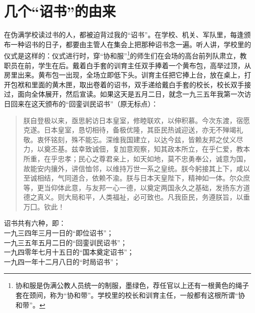 \fancyhead[RO]{} %
\fancyhead[LE]{} %
\chapter*{几个“诏书”的由来}
\thispagestyle{empty}
在伪满学校读过书的人，都被迫背过我的“诏书”。在学校、机关、军队里，每逢颁布一种诏书的日子，都要由主管人在集会上把那种诏书念一遍。听人讲，学校里的仪式是这样的：仪式进行时，穿“协和服”\footnote{协和服是伪满公教人员统一的制服，墨绿色，荐任官以上还有一根黄色的绳子套在颈间，称为“协和带”。学校里的校长和训育主任，一般都有这根所谓“协和带”。}的师生们在会场的高台前列队肃立，教职员在前，学生在后。戴着白手套的训育主任双手捧着一个黄布包，高举过顶，从房里出来。黄布包一出现，全场立即低下头。训育主任把它捧上台，放在桌上，打开包袱和里面的黄木匣，取出卷着的诏书，双手递给戴白手套的校长，校长双手接过，面向全体展开，然后宣读。如果这天是五月二日，就念一九三五年我第一次访日回来在这天颁布的“回銮训民诏书”（原无标点）：\\

\begin{quote}
	朕自登极以来，亟思躬访日本皇室，修睦联欢，以伸积慕。今次东渡，宿愿克遂。日本皇室，恳切相待，备极优隆，其臣民热诚迎送，亦无不殚竭礼敬。衷怀铭刻，殊不能忘。深维我国建立，以达今兹，皆赖友邦之仗义尽力，以奠丕基。兹幸致诚佃，复加意观察，知其政本所立，在乎仁爱，教本所重，在乎忠孝；民心之尊君亲上，如天如地，莫不忠勇奉公，诚意为国，故能安内攘外，讲信恤邻，以维持万世一系之皇统。朕今躬接其上下，咸以至诚相结，气同道合，依赖不渝。朕与日本天皇陛下，精神如一体。尔众庶等，更当仰体此意，与友邦一心一德，以奠定两国永久之基础，发扬东方道德之真义。则大局和平，人类福祉，必可致也。凡我臣民，务遵朕旨，以垂万囗。钦此！\\
\end{quote}

诏书共有六种，即：\\

一九三四年三月一日的“即位诏书”；\\

一九三五年五月二日的“回銮训民诏书”；\\

一九四零年七月十五日的“国本奠定诏书”；\\

一九四一年十二月八日的“时局诏书”；\\

